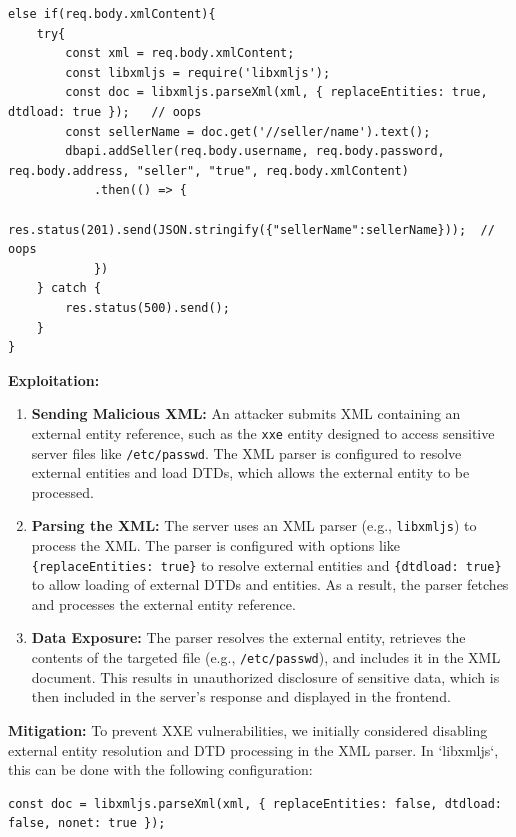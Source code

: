\documentclass[]{article}
\begin{document}
\begin{lstlisting}
else if(req.body.xmlContent){
    try{
        const xml = req.body.xmlContent;
        const libxmljs = require('libxmljs');
        const doc = libxmljs.parseXml(xml, { replaceEntities: true, dtdload: true });   // oops
        const sellerName = doc.get('//seller/name').text();
        dbapi.addSeller(req.body.username, req.body.password, req.body.address, "seller", "true", req.body.xmlContent)
            .then(() => {
                res.status(201).send(JSON.stringify({"sellerName":sellerName}));  // oops
            })
    } catch {
        res.status(500).send();
    }
}
\end{lstlisting}
\textbf{Exploitation:}

\begin{enumerate}
    \item \textbf{Sending Malicious XML:} An attacker submits XML containing an external entity reference, such as the \texttt{xxe} entity designed to access sensitive server files like \texttt{/etc/passwd}. The XML parser is configured to resolve external entities and load DTDs, which allows the external entity to be processed.

    \item \textbf{Parsing the XML:} The server uses an XML parser (e.g., \texttt{libxmljs}) to process the XML. The parser is configured with options like \texttt{\{replaceEntities: true\}} to resolve external entities and \texttt{\{dtdload: true\}} to allow loading of external DTDs and entities. As a result, the parser fetches and processes the external entity reference.

    \item \textbf{Data Exposure:} The parser resolves the external entity, retrieves the contents of the targeted file (e.g., \texttt{/etc/passwd}), and includes it in the XML document. This results in unauthorized disclosure of sensitive data, which is then included in the server's response and displayed in the frontend.
\end{enumerate}
\textbf{Mitigation:}
To prevent XXE vulnerabilities, we initially considered disabling external entity resolution and DTD processing in the XML parser. In `libxmljs`, this can be done with the following configuration:

\begin{lstlisting}
const doc = libxmljs.parseXml(xml, { replaceEntities: false, dtdload: false, nonet: true });
\end{lstlisting}
\end{document}
